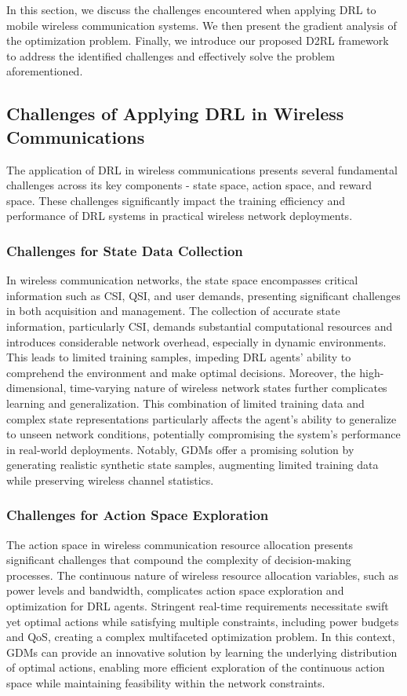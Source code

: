 \documentclass[comsoc,journal]{IEEEtran}
\begin{document}
In this section, we discuss the challenges encountered when applying DRL to mobile wireless communication systems. We then present the gradient analysis of the optimization problem. Finally, we introduce our proposed D2RL framework to address the identified challenges and effectively solve the problem aforementioned.
\label{sec:algo}
\vspace{-8pt}
\subsection{Challenges of Applying DRL in Wireless Communications}
The application of DRL in wireless communications presents several fundamental challenges across its key components - state space, action space, and reward space. These challenges significantly impact the training efficiency and performance of DRL systems in practical wireless network deployments.
\subsubsection{Challenges for State Data Collection}
In wireless communication networks, the state space encompasses critical information such as CSI, QSI, and user demands, presenting significant challenges in both acquisition and management. The collection of accurate state information, particularly CSI, demands substantial computational resources and introduces considerable network overhead, especially in dynamic environments. This leads to limited training samples, impeding DRL agents' ability to comprehend the environment and make optimal decisions. Moreover, the high-dimensional, time-varying nature of wireless network states further complicates learning and generalization. This combination of limited training data and complex state representations particularly affects the agent's ability to generalize to unseen network conditions, potentially compromising the system's performance in real-world deployments.
Notably, GDMs offer a promising solution by generating realistic synthetic state samples, augmenting limited training data while preserving wireless channel statistics.

\subsubsection{Challenges for Action Space Exploration}
The action space in wireless communication resource allocation presents significant challenges that compound the complexity of decision-making processes. The continuous nature of wireless resource allocation variables, such as power levels and bandwidth, complicates action space exploration and optimization for DRL agents. Stringent real-time requirements necessitate swift yet optimal actions while satisfying multiple constraints, including power budgets and QoS, creating a complex multifaceted optimization problem. In this context, GDMs can provide an innovative solution by learning the underlying distribution of optimal actions, enabling more efficient exploration of the continuous action space while maintaining feasibility within the network constraints.
\end{document}
